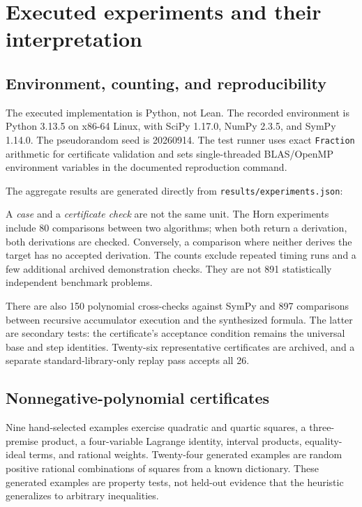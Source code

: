 \documentclass[11pt,a4paper]{article}
\newcommand{\codepath}[1]{\nolinkurl{#1}}
\begin{document}
\section{Executed experiments and their interpretation}
\label{sec:experiments}

\subsection{Environment, counting, and reproducibility}

The executed implementation is Python, not Lean. The recorded environment is Python 3.13.5 on x86-64 Linux, with SciPy 1.17.0, NumPy 2.3.5, and SymPy 1.14.0. The pseudorandom seed is 20260914. The test runner uses exact \texttt{Fraction} arithmetic for certificate validation and sets single-threaded BLAS/OpenMP environment variables in the documented reproduction command.

The aggregate results are generated directly from \codepath{results/experiments.json}:
\begin{center}
\small

\end{center}

A \emph{case} and a \emph{certificate check} are not the same unit. The Horn experiments include 80 comparisons between two algorithms; when both return a derivation, both derivations are checked. Conversely, a comparison where neither derives the target has no accepted derivation. The counts exclude repeated timing runs and a few additional archived demonstration checks. They are not 891 statistically independent benchmark problems.

There are also 150 polynomial cross-checks against SymPy and 897 comparisons between recursive accumulator execution and the synthesized formula. The latter are secondary tests: the certificate's acceptance condition remains the universal base and step identities. Twenty-six representative certificates are archived, and a separate standard-library-only replay pass accepts all 26.

\subsection{Nonnegative-polynomial certificates}

Nine hand-selected examples exercise quadratic and quartic squares, a three-premise product, a four-variable Lagrange identity, interval products, equality-ideal terms, and rational weights. Twenty-four generated examples are random positive rational combinations of squares from a known dictionary. These generated examples are property tests, not held-out evidence that the heuristic generalizes to arbitrary inequalities.
\end{document}
